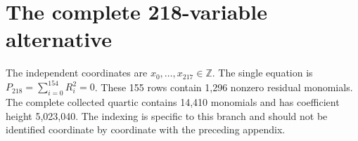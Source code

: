 \documentclass[10pt,letterpaper]{article}
\theoremstyle{definition}\newtheorem{definition}[theorem]{Definition}
\newcommand{\Z}{\mathbb Z}\newcommand{\Q}{\mathbb Q}
\begin{document}
\clearpage
\section{The complete 218-variable alternative}
\label{app:218}
The independent coordinates are $x_0,\ldots,x_{217}\in\Z$.
The single equation is $P_{218}=\sum_{i=0}^{154}R_i^2=0$.
These 155 rows contain 1,296 nonzero residual monomials. The complete
collected quartic contains 14,410 monomials and has coefficient height
5,023,040. The indexing is specific to this branch and should not be
identified coordinate by coordinate with the preceding appendix.
\begingroup\small\setlength{\jot}{2pt}
\setlength{\abovedisplayskip}{5pt}\setlength{\belowdisplayskip}{5pt}
\allowdisplaybreaks[4]

\endgroup
\end{document}
